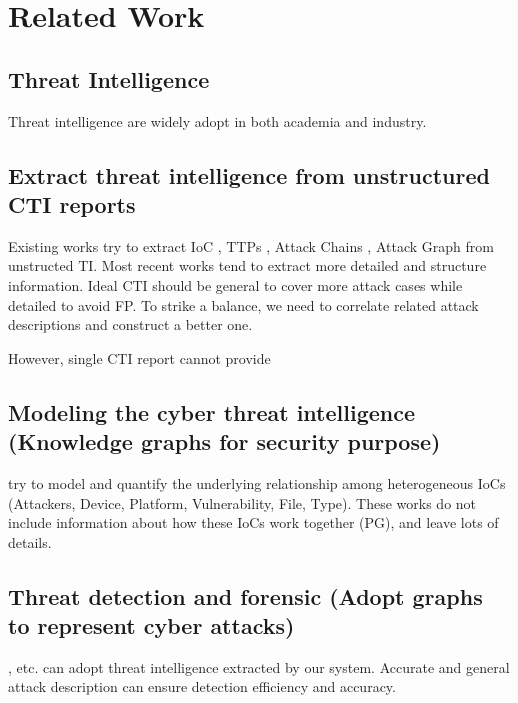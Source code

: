 \section{Related Work}
\label{sec:relatedworks}

\subsection{Threat Intelligence}

Threat intelligence are widely adopt in both academia and industry. \cite{Berady2021,Michael2021} 

\subsection{Extract threat intelligence from unstructured CTI reports}

Existing works try to extract IoC \cite{Liao}, TTPs \cite{Husari2017}, Attack Chains \cite{Zhu2018}, Attack Graph \cite{Gao} from unstructed TI. Most recent works tend to extract more detailed and structure information. Ideal CTI should be general to cover more attack cases while detailed to avoid FP. To strike a balance, we need to correlate related attack descriptions and construct a better one.

However, single CTI report cannot provide 

\subsection{Modeling the cyber threat intelligence (Knowledge graphs for security purpose)}

\cite{Gao2020,Zhao2020} try to model and quantify the underlying relationship among heterogeneous IoCs (Attackers, Device, Platform, Vulnerability, File, Type). These works do not include information about how these IoCs work together (PG), and leave lots of details.

\subsection{Threat detection and forensic (Adopt graphs to represent cyber attacks)}

\cite{Milajerdi2019}, etc. can adopt threat intelligence extracted by our system. Accurate and general attack description can ensure detection efficiency and accuracy.